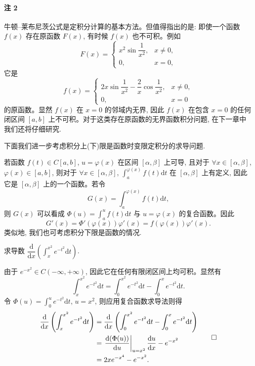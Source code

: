 \paragraph*{注 2}
牛顿--莱布尼茨公式是定积分计算的基本方法。但值得指出的是: 即使一个函数 $f(x)$ 存在原函数 $F(x)$, 有时候 $f(x)$ 也不可积。例如
\[
  F(x)=
  \begin{cases}
    x^2\sin\dfrac{1}{x^2}, & x\neq0,\\
    0, & x=0,
  \end{cases}
\]
它是
\[
  f(x)=
  \begin{cases}
    2x\sin\dfrac{1}{x^2}-\dfrac{2}{x}\cos\dfrac{1}{x^2}, & x\neq0,\\
    0, & x=0
  \end{cases}
\]
的原函数。显然 $f(x)$ 在 $x=0$ 的邻域内无界, 因此 $f(x)$ 在包含 $x=0$ 的任何闭区间 $[a,b]$ 上不可积。对于这类存在原函数的无界函数积分问题, 在下一章中我们还将仔细研究.

下面我们进一步考虑积分上(下)限是函数时变限定积分的求导问题.

若函数 $f(t)\in C[a,b]$, $u=\varphi(x)$ 在区间 $[\alpha,\beta]$ 上可导, 且对于 $\forall x\in[\alpha,\beta]$, $\varphi(x)\in[a,b]$, 则对于 $\forall x\in[\alpha,\beta]$, $\int_a^{\varphi(x)} f(t)\mathrm dt$ 在 $[\alpha,\beta]$ 上有定义, 因此它是 $[\alpha,\beta]$ 上的一个函数。若令
\[
  G(x)=\int_a^{\varphi(x)} f(t)\mathrm dt,
\]
则 $G(x)$ 可以看成 $\Phi(u)=\int_a^u f(t)\mathrm dt$ 与 $u=\varphi(x)$ 的复合函数。因此
\[
  G'(x)=\Phi'(\varphi(x))\varphi'(x)=f(\varphi(x))\varphi'(x).
\]
类似地, 我们也可考虑积分下限是函数的情况.

\begin{example}\label{example:ma-7-4-1}
求导数 $\dfrac{\mathrm d}{\mathrm dx}\left(\int_x^{x^2} e^{-t^2}\mathrm dt\right)$.
\end{example}


\begin{solve}
由于 $e^{-x^2}\in C(-\infty,+\infty)$, 因此它在任何有限闭区间上均可积。显然有
\[
  \int_x^{x^2} e^{-t^2}\mathrm dt=\int_0^{x^2} e^{-t^2}\mathrm dt-\int_0^x e^{-t^2}\mathrm dt.
\]
令 $\Phi(u)=\int_0^u e^{-t^2}\mathrm dt$, $u=x^2$, 则应用复合函数求导法则得
\[
\begin{aligned}
  \frac{\mathrm d}{\mathrm dx}\left(\int_x^{x^2} e^{-t^2}\mathrm dt\right)
  &=\frac{\mathrm d}{\mathrm dx}\left(\int_0^{x^2} e^{-t^2}\mathrm dt-\int_0^x e^{-t^2}\mathrm dt\right)\\
  &=\left.\frac{\mathrm d(\Phi(u))}{\mathrm du}\right|_{u=x^2}\frac{\mathrm du}{\mathrm dx}-e^{-x^2}\\
  &=2xe^{-x^4}-e^{-x^2}.
\end{aligned}
\qedhere
\]
\end{solve}


